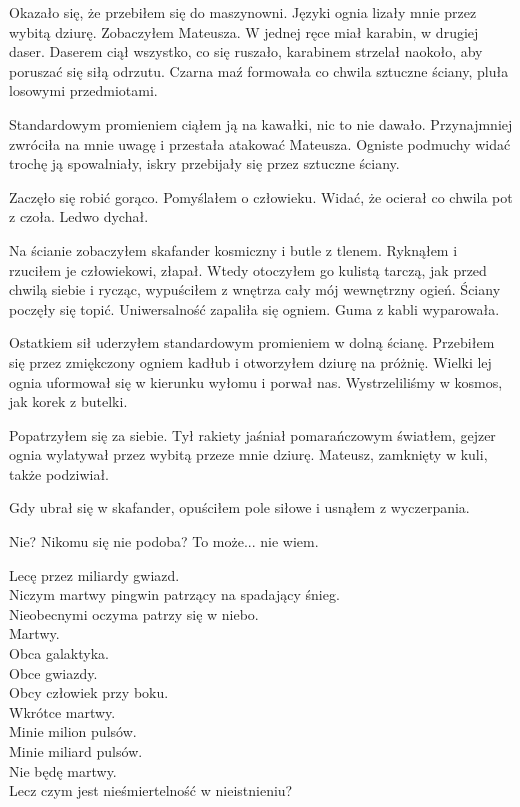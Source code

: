 Okazało się, że przebiłem się do maszynowni.
Języki ognia lizały mnie przez wybitą dziurę.
Zobaczyłem Mateusza. 
W jednej ręce miał karabin, w drugiej daser.
Daserem ciął wszystko, co się ruszało, karabinem strzelał naokoło, aby poruszać się siłą odrzutu.
Czarna maź formowała co chwila sztuczne ściany, pluła losowymi przedmiotami. 

Standardowym promieniem ciąłem ją na kawałki, nic to nie dawało.
Przynajmniej zwróciła na mnie uwagę i przestała atakować Mateusza.
Ogniste podmuchy widać trochę ją spowalniały, iskry przebijały się przez sztuczne ściany.

Zaczęło się robić gorąco. Pomyślałem o człowieku. 
Widać, że ocierał co chwila pot z czoła.
Ledwo dychał.

Na ścianie zobaczyłem skafander kosmiczny i butle z tlenem.
Ryknąłem i rzuciłem je człowiekowi, złapał.
Wtedy otoczyłem go kulistą tarczą, jak przed chwilą siebie i rycząc, wypuściłem z wnętrza cały mój wewnętrzny ogień.
Ściany poczęły się topić.
Uniwersalność zapaliła się ogniem. 
Guma z kabli wyparowała. 

Ostatkiem sił uderzyłem standardowym promieniem w dolną ścianę.
Przebiłem się przez zmiękczony ogniem kadłub i otworzyłem dziurę na próżnię.
Wielki lej ognia uformował się w kierunku wyłomu i porwał nas.
Wystrzeliliśmy w kosmos, jak korek z butelki.

Popatrzyłem się za siebie. Tył rakiety jaśniał pomarańczowym światłem, gejzer ognia wylatywał przez wybitą przeze mnie dziurę.
Mateusz, zamknięty w kuli, także podziwiał.

Gdy ubrał się w skafander, opuściłem pole siłowe i usnąłem z wyczerpania.

\divider{}

Nie?
Nikomu się nie podoba?
To może... nie wiem.

\divider{}

Lecę przez miliardy gwiazd. \\
Niczym martwy pingwin patrzący na spadający śnieg. \\
Nieobecnymi oczyma patrzy się w niebo. \\
Martwy. \\

Obca galaktyka. \\
Obce gwiazdy. \\
Obcy człowiek przy boku. \\
Wkrótce martwy. \\

Minie milion pulsów. \\
Minie miliard pulsów. \\
Nie będę martwy. \\
Lecz czym jest nieśmiertelność w nieistnieniu? \\

